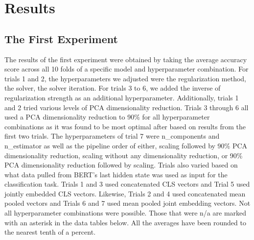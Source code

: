 \documentclass[12pt,letterpaper]{article}
\begin{document}
\section{Results}
\subsection{The First Experiment}
The results of the first experiment were obtained by taking the average accuracy score across all 10 folds of a specific model and hyperparameter combination. For trials 1 and 2, the hyperparameters we adjusted were the regularization method, the solver, the solver iteration. For trials 3 to 6, we added the inverse of regularization strength as an additional hyperparameter. Additionally, trials 1 and 2 tried various levels of PCA dimensionality reduction. Trials 3 through 6 all used a PCA dimensionality reduction to 90\% for all hyperparameter combinations as it was found to be most optimal after based on results from the first two trials. The hyperparameters of trial 7 were n\_components and n\_estimator as well as the pipeline order of either, scaling followed by 90\% PCA dimensionality reduction, scaling without any dimensionality reduction, or 90\% PCA dimensionality reduction followed by scaling. Trials also varied based on what data pulled from BERT's last hidden state was used as input for the classification task. Trials 1 and 3 used concatenated CLS vectors and Trial 5 used jointly embedded CLS vectors. Likewise, Trials 2 and 4 used concatenated mean pooled vectors and Trials 6 and 7 used mean pooled joint embedding vectors. Not all hyperparameter combinations were possible. Those that were n/a are marked with an asterisk in the data tables below. All the averages have been rounded to the nearest tenth of a percent.

\end{document}
